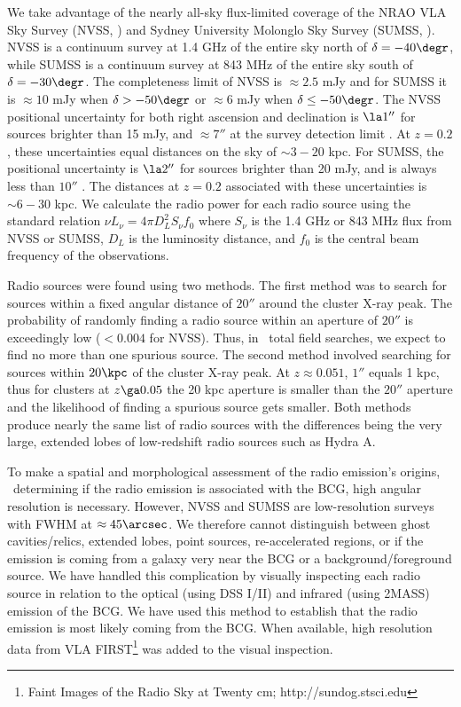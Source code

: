 \documentclass{emulateapj}
\begin{document}
We take advantage of the nearly all-sky flux-limited coverage of the
NRAO VLA Sky Survey (NVSS, \citealt{nvss}) and Sydney University
Molonglo Sky Survey (SUMSS, \citealt{sumss1, sumss2}). NVSS is a
continuum survey at 1.4 GHz of the entire sky north of $\delta =
-40\degr$, while SUMSS is a continuum survey at 843 MHz of the entire
sky south of $\delta = -30\degr$. The completeness limit of NVSS is
$\approx 2.5$ mJy and for SUMSS it is $\approx 10$ mJy when $\delta >
-50\degr$ or $\approx 6$ mJy when $\delta \leq -50\degr$. The NVSS
positional uncertainty for both right ascension and declination is
$\la 1''$ for sources brighter than 15 mJy, and $\approx 7''$ at the
survey detection limit \citep{nvss}. At $z=0.2$, these uncertainties
equal distances on the sky of $\sim3-20$ kpc. For SUMSS, the
positional uncertainty is $\la 2''$ for sources brighter than 20 mJy,
and is always less than $10''$ \citep{sumss1,sumss2}. The distances at
$z=0.2$ associated with these uncertainties is $\sim6-30$ kpc. We
calculate the radio power for each radio source using the standard
relation $\nu L_{\nu} = 4 \pi D_L^2 S_{\nu} f_0$ where $S_{\nu}$ is
the 1.4 GHz or 843 MHz flux from NVSS or SUMSS, $D_L$ is the
luminosity distance, and $f_0$ is the central beam frequency of the
observations.

Radio sources were found using two methods. The first method was to
search for sources within a fixed angular distance of $20''$ around
the cluster X-ray peak. The probability of randomly finding a radio
source within an aperture of $20''$ is exceedingly low ($< 0.004$ for
NVSS). Thus, in \clnum\ total field searches, we expect to find no
more than one spurious source. The second method involved searching
for sources within $20\kpc$ of the cluster X-ray peak. At $z \approx
0.051$, $1''$ equals 1 kpc, thus for clusters at $z \ga 0.05$ the 20
kpc aperture is smaller than the $20''$ aperture and the likelihood of
finding a spurious source gets smaller. Both methods produce nearly
the same list of radio sources with the differences being the very
large, extended lobes of low-redshift radio sources such as Hydra A.

To make a spatial and morphological assessment of the radio emission's
origins, \ie\ determining if the radio emission is associated with the
BCG, high angular resolution is necessary. However, NVSS and SUMSS are
low-resolution surveys with FWHM at $\approx 45\arcsec$. We therefore
cannot distinguish between ghost cavities/relics, extended lobes,
point sources, re-accelerated regions, or if the emission is coming
from a galaxy very near the BCG or a background/foreground source. We
have handled this complication by visually inspecting each radio
source in relation to the optical (using DSS I/II) and infrared (using
2MASS) emission of the BCG. We have used this method to establish that
the radio emission is most likely coming from the BCG. When available,
high resolution data from VLA FIRST\footnote{Faint Images of the Radio
 Sky at Twenty cm; http://sundog.stsci.edu} was added to the
visual inspection.
\end{document}
